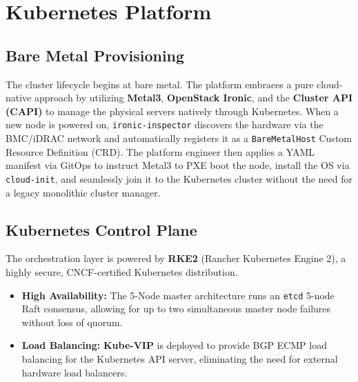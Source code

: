 \chapter{Kubernetes Platform}

\section{Bare Metal Provisioning}
The cluster lifecycle begins at bare metal. The platform embraces a pure cloud-native approach by utilizing \textbf{Metal3}, \textbf{OpenStack Ironic}, and the \textbf{Cluster API (CAPI)} to manage the physical servers natively through Kubernetes. When a new node is powered on, \texttt{ironic-inspector} discovers the hardware via the BMC/iDRAC network and automatically registers it as a \texttt{BareMetalHost} Custom Resource Definition (CRD). The platform engineer then applies a YAML manifest via GitOps to instruct Metal3 to PXE boot the node, install the OS via \texttt{cloud-init}, and seamlessly join it to the Kubernetes cluster without the need for a legacy monolithic cluster manager.

\section{Kubernetes Control Plane}
The orchestration layer is powered by \textbf{RKE2} (Rancher Kubernetes Engine 2), a highly secure, CNCF-certified Kubernetes distribution. 
\begin{itemize}
    \item \textbf{High Availability:} The 5-Node master architecture runs an \texttt{etcd} 5-node Raft consensus, allowing for up to two simultaneous master node failures without loss of quorum.
    \item \textbf{Load Balancing:} \textbf{Kube-VIP} is deployed to provide BGP ECMP load balancing for the Kubernetes API server, eliminating the need for external hardware load balancers.
\end{itemize}

